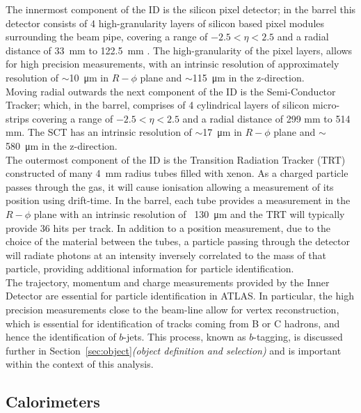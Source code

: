 The innermost component of the ID is the silicon pixel detector;
in the barrel this detector consists of 4 high-granularity layers of silicon based pixel modules surrounding the beam pipe,
covering a range of $-2.5 < \eta < 2.5$ and a radial distance of \SI{33}{mm} to \SI{122.5}{mm} \cite{det-IBL_TDR, det-IBL_Talk}.
The high-granularity of the pixel layers, allows for high precision measurements,
with an intrinsic resolution of approximately resolution of $\sim$\SI{10}{\micro\metre} in $R-\phi$ plane
and $\sim$\SI{115}{\micro\metre} in the z-direction. \\

Moving radial outwards the next component of the ID is the Semi-Conductor Tracker;
which, in the barrel, comprises of 4 cylindrical layers of silicon micro-strips
covering a range of $-2.5 < \eta < 2.5$ and a radial distance of 299 mm to 514 mm.
The SCT has an intrinsic resolution of $\sim$\SI{17}{\micro\metre} in $R-\phi$ plane
and $\sim$\SI{580}{\micro\metre} in the z-direction. \\

The outermost component of the ID is the Transition Radiation Tracker (TRT)
constructed of many \SI{4}{\mm} radius tubes filled with xenon.
As a charged particle passes through the gas,
it will cause ionisation allowing a measurement of its position using drift-time.
In the barrel, each tube provides a measurement in the $R-\phi$ plane
with an intrinsic resolution of ~\SI{130}{\micro\metre}
and the TRT will typically provide 36 hits per track.
In addition to a position measurement, due to the choice of the material between the tubes,
a particle passing through the detector will radiate photons
at an intensity inversely correlated to the mass of that particle,
providing additional information for particle identification. \\

The trajectory, momentum and charge measurements provided by the Inner Detector are essential for particle identification in ATLAS.
In particular, the high precision measurements close to the beam-line allow for vertex reconstruction,
which is essential for identification of tracks coming from B or C hadrons, and hence the identification of $b$-jets.
This process, known as $b$-tagging, is discussed further in Section~\ref{sec:object}\textit{(object definition and selection)}
and is important within the context of this analysis. \\

\subsection{Calorimeters}
\label{sec:det-calo}

